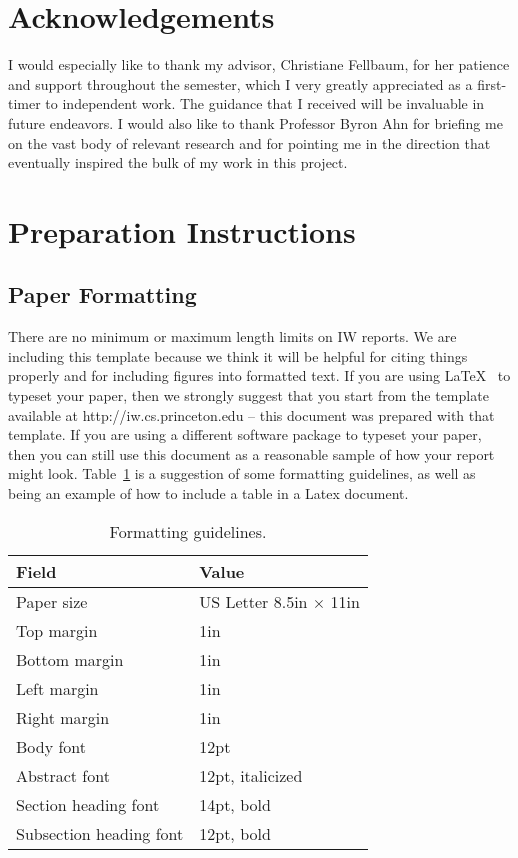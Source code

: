 \documentclass[pageno]{jpaper}
\begin{document}
\section{Acknowledgements}
I would especially like to thank my advisor, Christiane Fellbaum, for her patience and support throughout the semester, which I very greatly appreciated as a first-timer to independent work. The guidance that I received will be invaluable in future endeavors. I would also like to thank Professor Byron Ahn for briefing me on the vast body of relevant research and for pointing me in the direction that eventually inspired the bulk of my work in this project.


\section{Preparation Instructions}

\subsection{Paper Formatting}
\label{section:formatting}

There are no minimum or maximum length limits on IW reports.  
We are including this template because we think it will be helpful
for citing things properly and for including figures into formatted
text.  If you are using \LaTeX~\cite{lamport94} 
to typeset your paper, then we strongly suggest
that you start from the template available at
http://iw.cs.princeton.edu -- this
document was prepared with that template.  
If you are using a different software package to typeset your paper, 
then you can still use this document as a reasonable sample of 
how your report might look.  Table~\ref{table:formatting} is a suggestion
of some formatting guidelines, as well as being an example of how to
include a table in a Latex document.

\begin{table}[hbt]
  \centering
  \begin{tabular}{|l|l|}
    \hline
    \textbf{Field} & \textbf{Value}\\
    \hline
    \hline
    Paper size & US Letter 8.5in $\times$ 11in\\
    \hline
    Top margin & 1in\\
    \hline
    Bottom margin & 1in\\
    \hline
    Left margin & 1in\\
    \hline
    Right margin & 1in\\
    \hline
    Body font & 12pt\\
    \hline
    Abstract font & 12pt, italicized\\
    \hline
    Section heading font & 14pt, bold\\
    \hline
    Subsection heading font & 12pt, bold\\
    \hline
  \end{tabular}
  \caption{Formatting guidelines. }
  \label{table:formatting}
\end{table}
\end{document}
